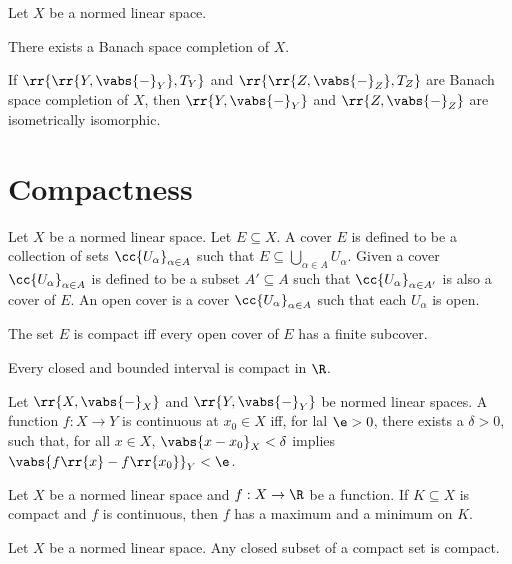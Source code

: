 \documentclass{article}
\begin{document}
\begin{theorem}
	Let $X$ be a normed linear space.

	There exists a Banach space completion of $X$.

	If $\rr{\rr{Y,\vabs{-}_{Y}}, T_Y}$ and $\rr{\rr{Z,\vabs{-}_{Z}}, T_Z}$ are Banach space
	completion of $X$, then $\rr{Y,\vabs{-}_{Y}}$ and $\rr{Z,\vabs{-}_{Z}}$ are isometrically
	isomorphic.
\end{theorem}

\section{Compactness}
\label{sec:compactness}

\begin{definition}
	Let $X$ be a normed linear space. Let $E\subseteq X$. A cover $E$ is defined to be a
	collection of sets $\cc{U_\alpha}_{\alpha\in A}$ such that
	$E\subseteq\bigcup_{\alpha\in A}U_\alpha$. Given a cover $\cc{U_\alpha}_{\alpha\in A}$
	is defined to be a subset $A'\subseteq A$ such that $\cc{U_\alpha}_{\alpha\in A'}$ is also
	a cover of $E$. An open cover is a cover $\cc{U_\alpha}_{\alpha\in A}$ such that each
	$U_\alpha$ is open.

	The set $E$ is compact iff every open cover of $E$ has a finite subcover.
\end{definition}

\begin{theorem}
	Every closed and bounded interval is compact in $\R$.
\end{theorem}

\begin{theorem}
	Let $\rr{X,\vabs{-}_{X}}$ and $\rr{Y,\vabs{-}_{Y}}$ be normed linear spaces. A function
	$f:X\to Y$ is continuous at $x_0\in X$ iff, for lal $\e > 0$, there exists a $\delta > 0$,
	such that, for all $x\in X$, $\vabs{x-x_0}_{X}<\delta$ implies
	$\vabs{f\rr{x}-f\rr{x_0}}_{Y}<\e$.
\end{theorem}

\begin{theorem}
	Let $X$ be a normed linear space and $f:X\to\R$ be a function. If $K\subseteq X$ is compact
	and $f$ is continuous, then $f$ has a maximum and a minimum on $K$.
\end{theorem}

\begin{theorem}
	Let $X$ be a normed linear space. Any closed subset of a compact set is compact.
\end{theorem}
\end{document}
